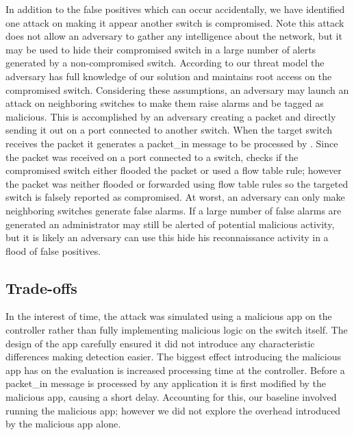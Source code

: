  In addition to the false positives which
can occur accidentally, we have identified one attack on \name making it
appear another switch is compromised. Note this attack does not allow an
adversary to gather any intelligence about the network, but it may be
used to hide their compromised switch in a large number of alerts
generated by a non-compromised switch. According to our threat model the
adversary has full knowledge of our solution and maintains root access 
on the compromised switch. Considering these assumptions, an
adversary may launch an attack on neighboring switches to make them
raise alarms and be tagged as malicious. This is accomplished by an
adversary creating a packet and directly sending it out on a port
connected to another switch. When the target switch receives the packet
it generates a packet\_in message to be processed by \name. Since the
packet was received on a port connected to a switch, \name checks if the
compromised switch either flooded the packet or used a flow table rule;
however the packet was neither flooded or forwarded using flow table
rules so the targeted switch is falsely reported as compromised. At
worst, an adversary can only make neighboring switches generate false
alarms. If a large number of false alarms are generated an administrator
may still be alerted of potential malicious activity, but it is likely
an adversary can use this hide his reconnaissance activity in a flood of
false positives.

\subsection{Trade-offs}
 In the interest of time, the attack
was simulated using a malicious app on the controller rather than fully
implementing malicious logic on the switch itself. The design of the
app carefully ensured it did not introduce any characteristic
differences making detection easier. The biggest effect introducing
the malicious app has on the evaluation is increased processing time
at the controller. Before a packet\_in message is processed by any
application it is first modified by the malicious app, causing a short
delay. Accounting for this, our baseline involved running the malicious
app; however we did not explore the overhead introduced by the malicious
app alone. 

